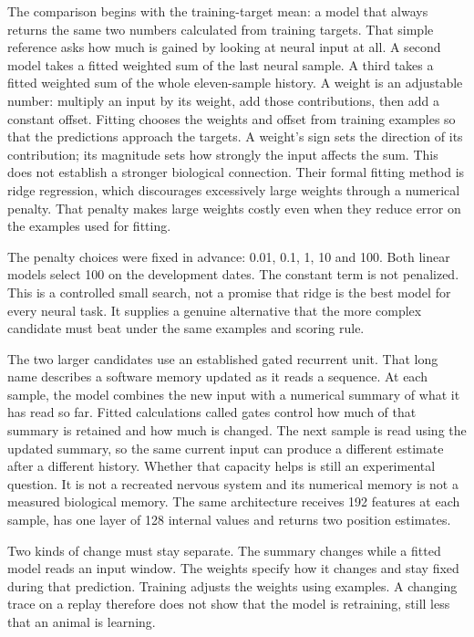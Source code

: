 The comparison begins with the training-target mean: a model that always returns
the same two numbers calculated from training targets. That simple reference
asks how much is gained by looking at neural input at all. A second model takes
a fitted weighted sum of the last neural sample. A third takes a fitted weighted
sum of the whole eleven-sample history. A weight is an adjustable number: multiply
an input by its weight, add those contributions, then add a constant offset.
Fitting chooses the weights and offset from training examples so that the
predictions approach the targets. A weight's sign sets the direction of its
contribution; its magnitude sets how strongly the input affects the sum. This
does not establish a stronger biological connection. Their formal fitting method
is ridge regression, which discourages
excessively large weights through a numerical penalty. That penalty makes large
weights costly even when they reduce error on the examples used for fitting.

The penalty choices were fixed in advance: 0.01, 0.1, 1, 10 and 100. Both linear
models select 100 on the development dates. The constant term is not penalized.
This is a controlled small search, not a promise that ridge is the best model
for every neural task. It supplies a genuine alternative that the more complex
candidate must beat under the same examples and scoring rule.

The two larger candidates use an established gated recurrent unit. That long
name describes a software memory updated as it reads a sequence. At each sample,
the model combines the new input with a numerical summary of what it has read
so far. Fitted calculations called gates control how much of that summary is
retained and how much is changed. The next sample is read using the updated
summary, so the same current input can produce a different estimate after a
different history. Whether that capacity helps is still an experimental question.
It is not a recreated nervous system and its numerical memory is not a measured
biological memory. The same architecture receives 192 features at each sample,
has one layer of 128 internal values and returns two position estimates.

Two kinds of change must stay separate. The summary changes while a fitted model
reads an input window. The weights specify how it changes and stay fixed during
that prediction. Training adjusts the weights using examples. A changing trace
on a replay therefore does not show that the model is retraining, still less
that an animal is learning.

